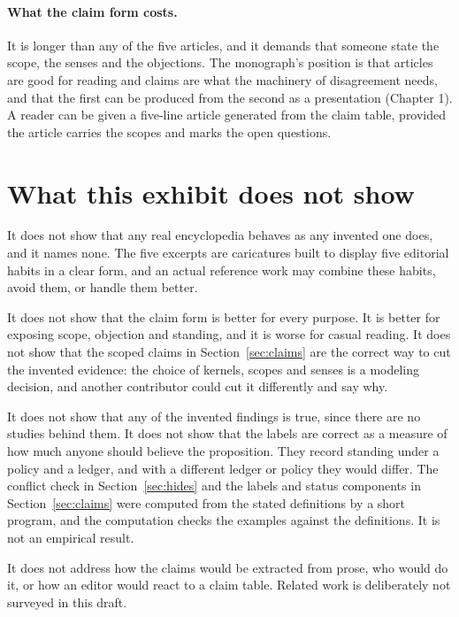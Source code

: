 \documentclass[11pt]{article}
\begin{document}
\paragraph{What the claim form costs.} It is longer than any of the five articles, and it demands that someone state the scope, the senses and the objections. The monograph's position is that articles are good for reading and claims are what the machinery of disagreement needs, and that the first can be produced from the second as a presentation (Chapter 1). A reader can be given a five-line article generated from the claim table, provided the article carries the scopes and marks the open questions.

\section{What this exhibit does not show}\label{sec:limits}

It does not show that any real encyclopedia behaves as any invented one does, and it names none. The five excerpts are caricatures built to display five editorial habits in a clear form, and an actual reference work may combine these habits, avoid them, or handle them better.

It does not show that the claim form is better for every purpose. It is better for exposing scope, objection and standing, and it is worse for casual reading. It does not show that the scoped claims in Section~\ref{sec:claims} are the correct way to cut the invented evidence: the choice of kernels, scopes and senses is a modeling decision, and another contributor could cut it differently and say why.

It does not show that any of the invented findings is true, since there are no studies behind them. It does not show that the labels are correct as a measure of how much anyone should believe the proposition. They record standing under a policy and a ledger, and with a different ledger or policy they would differ. The conflict check in Section~\ref{sec:hides} and the labels and status components in Section~\ref{sec:claims} were computed from the stated definitions by a short program, and the computation checks the examples against the definitions. It is not an empirical result.

It does not address how the claims would be extracted from prose, who would do it, or how an editor would react to a claim table. Related work is deliberately not surveyed in this draft.

\end{document}

